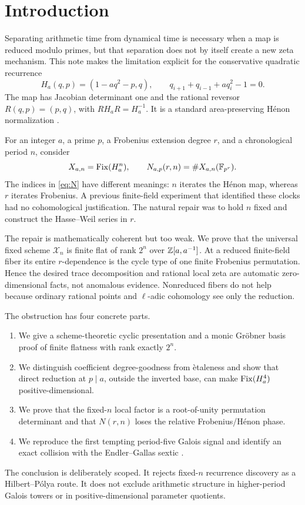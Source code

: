 \section{Introduction}

Separating arithmetic time from dynamical time is necessary when a map is
reduced modulo primes, but that separation does not by itself create a new
zeta mechanism.  This note makes the limitation explicit for the conservative
quadratic recurrence
\begin{equation}\label{eq:henon}
 H_a(q,p)=(1-aq^2-p,q),
 \qquad q_{i+1}+q_{i-1}+a q_i^2-1=0.
\end{equation}
The map has Jacobian determinant one and the rational reversor
$R(q,p)=(p,q)$, with $RH_aR=H_a^{-1}$.  It is a standard area-preserving
H\'enon normalization \citep{henon1969,friedland1989}.

For an integer $a$, a prime $p$, a Frobenius extension degree $r$, and a
chronological period $n$, consider
\begin{equation}\label{eq:N}
 X_{a,n}=\operatorname{Fix}(H_a^n),\qquad
 N_{a,p}(r,n)=\#X_{a,n}(\mathbb F_{p^r}).
\end{equation}
The indices in \eqref{eq:N} have different meanings: $n$ iterates the H\'enon
map, whereas $r$ iterates Frobenius.  A previous finite-field experiment that
identified these clocks had no cohomological justification.  The natural
repair was to hold $n$ fixed and construct the Hasse--Weil series in $r$.

The repair is mathematically coherent but too weak.  We prove that the
universal fixed scheme $\mathcal X_n$ is finite flat of rank $2^n$ over
$\mathbb Z[a,a^{-1}]$.  At a reduced finite-field fiber its entire $r$-dependence is
the cycle type of one finite Frobenius permutation.  Hence the desired trace
decomposition and rational local zeta are automatic zero-dimensional facts,
not anomalous evidence.  Nonreduced fibers do not help because ordinary
rational points and $\ell$-adic cohomology see only the reduction.

The obstruction has four concrete parts.
\begin{enumerate}[leftmargin=*,label=(\roman*)]
 \item We give a scheme-theoretic cyclic presentation and a monic Gr\"obner
 basis proof of finite flatness with rank exactly $2^n$.
 \item We distinguish coefficient degree-goodness from \`etaleness and show
 that direct reduction at $p\mid a$, outside the inverted base, can make
 $\operatorname{Fix}(H_a^4)$ positive-dimensional.
 \item We prove that the fixed-$n$ local factor is a root-of-unity permutation
 determinant and that $N(r,n)$ loses the relative Frobenius/H\'enon phase.
 \item We reproduce the first tempting period-five Galois signal and identify
 an exact collision with the Endler--Gallas sextic
 \citep{endler2006}.
\end{enumerate}

The conclusion is deliberately scoped.  It rejects fixed-$n$ recurrence
discovery as a Hilbert--P\'olya route.  It does not exclude arithmetic structure
in higher-period Galois towers or in positive-dimensional parameter quotients.
